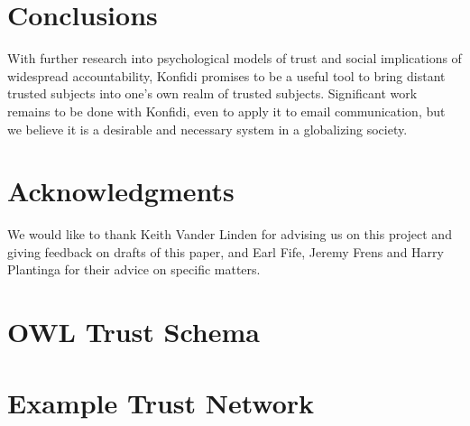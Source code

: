 \documentclass[letterpaper]{www2006-submission}
\begin{document}
\section{Conclusions}
With further research into psychological models of trust and social implications of widespread accountability, Konfidi promises to be a useful tool to bring distant trusted subjects into one's own realm of trusted subjects.  Significant work remains to be done with Konfidi, even to apply it to email communication, but we believe it is a desirable and necessary system in a globalizing society.

\section{Acknowledgments}
We would like to thank Keith Vander Linden for advising us on this project and giving feedback on drafts of this paper, and Earl Fife, Jeremy Frens and Harry Plantinga for their advice on specific matters.


  


\onecolumn

\appendix

\section{OWL Trust Schema}
\label{app:schemaCode}
{\scriptsize}
\normalsize

\section{Example Trust Network}
\label{app:trustExample}
{\scriptsize}

\twocolumn

\balancecolumns
\end{document}
